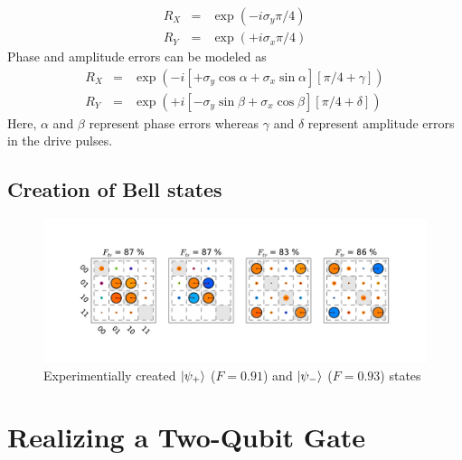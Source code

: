 \begin{eqnarray}
R_{X} & = & \exp{\left( -i \sigma_y \pi / 4\right)} \\
R_{Y} & = & \exp{\left( +i \sigma_x \pi / 4\right)} 
\end{eqnarray}
Phase and amplitude errors can be modeled as
\begin{eqnarray}
R_{X} & = & \exp{\left( -i \left[+\sigma_y\cos{\alpha}+\sigma_x\sin{\alpha} \right] \left[\pi / 4+\gamma\right]\right)} \\
R_{Y} & = & \exp{\left( +i \left[-\sigma_y\sin{\beta}+\sigma_x\cos{\beta}\right] \left[\pi / 4+\delta\right]\right)} 
\end{eqnarray}
Here, $\alpha$ and $\beta$ represent phase errors whereas $\gamma$ and $\delta$ represent amplitude errors in the drive pulses.

\subsection{Creation of Bell states}

\begin{figure}[ht!]
  \flushright
	\includegraphics[width=1\textwidth]{"./data/ct5/2011_02_09 preparation of bell states/bell matrices"}
	\caption{Experimentially created $\left| \psi_+ \right>$ ($F = 0.91$) and $\left| \psi_- \right>$ ($F=0.93$) states}
	\label{fig:BellStates}
\end{figure}


\section{Realizing a Two-Qubit Gate}


